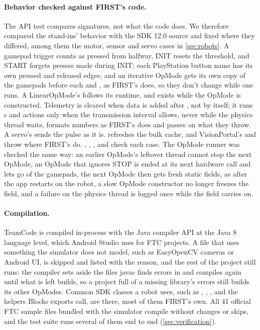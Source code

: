 \documentclass[10pt,twocolumn,letterpaper]{article}
\begin{document}
\paragraph{Behavior checked against FIRST's code.} The API test compares signatures, not what the code does. We therefore compared the stand-ins' behavior with the SDK 12.0 source and fixed where they differed, among them the motor, sensor and servo cases in \cref{sec:robots}. A gamepad trigger counts as pressed from halfway, INIT resets the threshold, and START forgets presses made during INIT; each PlayStation button name has its own pressed and released edges; and an iterative OpMode gets its own copy of the gamepads before each  and , as FIRST's  does, so they don't change while one runs. A LinearOpMode's  follows its runtime, and  exists while the OpMode is constructed. Telemetry is cleared when data is added after , not by  itself; it runs s and actions only when the transmission interval allows, never while the physics thread waits, formats numbers as FIRST's does and passes on what they throw. A servo's  sends the pulse as it is.  refreshes the bulk cache, and VisionPortal's  and  throw where FIRST's do. , , ,  and  check each case. The OpMode runner was checked the same way: an earlier OpMode's leftover thread cannot stop the next OpMode, an OpMode that ignores STOP is ended at its next hardware call and lets go of the gamepads, the next OpMode then gets fresh static fields, as after the app restarts on the robot, a slow OpMode constructor no longer freezes the field, and a failure on the physics thread is logged once while the field carries on.

\paragraph{Compilation.} TeamCode is compiled in-process with the Java compiler API at the Java 8 language level, which Android Studio uses for FTC projects. A file that uses something the simulator does not model, such as EasyOpenCV cameras or Android UI, is skipped and listed with the reason, and the rest of the project still runs: the compiler sets aside the files javac finds errors in and compiles again until what is left builds, so a project full of a missing library's errors still builds its other OpModes. Common SDK classes a robot uses, such as , , ,  and the helpers Blocks exports call, are there, most of them FIRST's own. All 41 official FTC sample files bundled with the simulator compile without changes or skips, and the test suite runs several of them end to end (\cref{sec:verification}).
\end{document}

